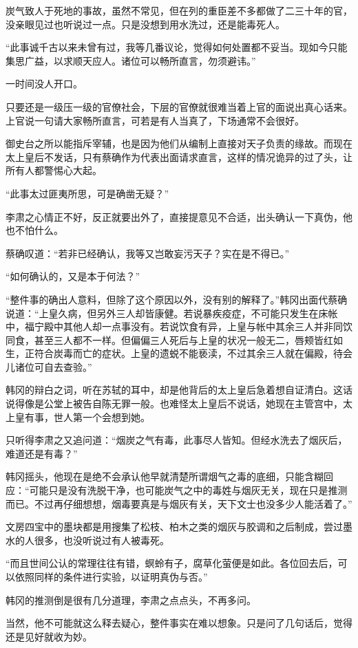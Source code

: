 炭气致人于死地的事故，虽然不常见，但在列的重臣差不多都做了二三十年的官，没亲眼见过也听说过一点。只是没想到用水洗过，还是能毒死人。

“此事诚千古以来未曾有过，我等几番议论，觉得如何处置都不妥当。现如今只能集思广益，以求顺天应人。诸位可以畅所直言，勿须避讳。”

一时间没人开口。

只要还是一级压一级的官僚社会，下层的官僚就很难当着上官的面说出真心话来。上官说一句请大家畅所直言，可若是有人当真了，下场通常不会很好。

御史台之所以能指斥宰辅，也是因为他们从编制上直接对天子负责的缘故。而现在太上皇后不发话，只有蔡确作为代表出面请求直言，这样的情况诡异的过了头，让所有人都警惕心大起。

“此事太过匪夷所思，可是确凿无疑？”

李肃之心情正不好，反正就要出外了，直接提意见不合适，出头确认一下真伪，他也不怕什么。

蔡确叹道：“若非已经确认，我等又岂敢妄污天子？实在是不得已。”

“如何确认的，又是本于何法？”

“整件事的确出人意料，但除了这个原因以外，没有别的解释了。”韩冈出面代蔡确说道：“上皇久病，但另外三人却皆康健。若说暴疾疫症，不可能只发生在床帐中，福宁殿中其他人却一点事没有。若说饮食有异，上皇与帐中其余三人并非同饮同食，甚至三人都不一样。但偏偏三人死后与上皇的状况一般无二，唇颊皆红如生，正符合炭毒而亡的症状。上皇的遗蜕不能亵渎，不过其余三人就在偏殿，待会儿诸位可自去查验。”

韩冈的辩白之词，听在苏轼的耳中，却是他背后的太上皇后急着想自证清白。这话说得像是公堂上被告自陈无罪一般。也难怪太上皇后不说话，她现在主管宫中，太上皇有事，世人第一个会想到她。

只听得李肃之又追问道：“烟炭之气有毒，此事尽人皆知。但经水洗去了烟灰后，难道还是有毒？”

韩冈摇头，他现在是绝不会承认他早就清楚所谓烟气之毒的底细，只能含糊回应：“可能只是没有洗脱干净，也可能炭气之中的毒姓与烟灰无关，现在只是推测而已。不过再仔细想想，烟毒要真是与烟灰有关，天下文士也没多少人能活着了。”

文房四宝中的墨块都是用搜集了松枝、柏木之类的烟灰与胶调和之后制成，尝过墨水的人很多，也没听说过有人被毒死。

“而且世间公认的常理往往有错，螟蛉有子，腐草化萤便是如此。各位回去后，可以依照同样的条件进行实验，以证明真伪与否。”

韩冈的推测倒是很有几分道理，李肃之点点头，不再多问。

当然，他不可能就这么释去疑心，整件事实在难以想象。只是问了几句话后，觉得还是见好就收为妙。

